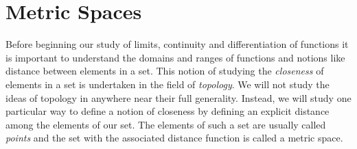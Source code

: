 \chapter{Metric Spaces}
Before beginning our study of limits, continuity and differentiation of functions it is important
to understand the domains and ranges of functions and notions like distance between elements
in a set. This notion of studying the \emph{closeness} of elements in a set is undertaken in the 
field of \emph{topology}. 
We will not study the ideas of topology in anywhere near their full generality. 
Instead, we will study one particular way to define a notion of closeness by defining an explicit 
distance among the elements of our set. The elements of such a set are usually called \emph{points}
and the set with the associated distance function is called a metric space.

